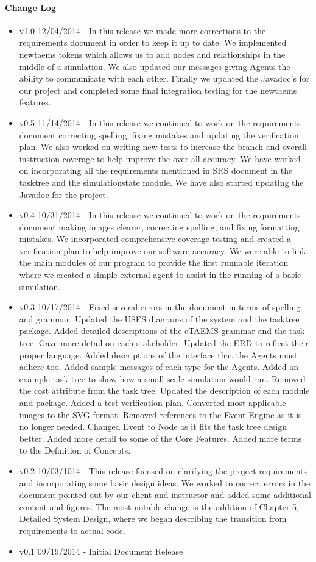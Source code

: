 \paragraph{Change Log}
\begin{itemize}
\item v1.0 12/04/2014 - In this release we made more corrections to the requirements document in order to keep it up to date. We implemented newtaems tokens which allows us to add nodes and relationships in the middle of a simulation. We also updated our messages giving Agents the ability to communicate with each other. Finally we updated the Javadoc's for our project and completed some final integration testing for the newtaems features.
\item v0.5 11/14/2014 - In this release we continued to work on the requirements document correcting spelling, fixing mistakes and updating the verification plan. We also worked on writing new tests to increase the branch and overall instruction coverage to help improve the over all accuracy. We have worked on incorporating all the requirements mentioned in SRS document in the tasktree and the simulationstate module. We have also started updating the Javadoc for the project.
\item v0.4 10/31/2014 - In this release we continued to work on the requirements
document making images clearer, correcting spelling, and fixing formatting mistakes. We incorporated comprehensive coverage testing and created a verification plan to help improve our software accuracy. We were able to link the main modules of our program to provide the first runnable iteration where we created a simple external agent to assist in the running of a basic simulation. 
\item v0.3 10/17/2014 - Fixed several errors in the document in terms
of spelling and grammar. Updated the USES diagrams of the system and the tasktree package. Added detailed descriptions of the cTAEMS grammar and the task tree. Gave more detail on each stakeholder. Updated the ERD to reflect their proper language. Added descriptions of the interface that the Agents must adhere too. Added sample messages of each type for the Agents. Added an example task tree to show how a small scale simulation would run. Removed the cost attribute from the task tree. Updated the description of each module and package. Added a test verification plan. Converted most applicable images to the SVG format. Removed references to the Event Engine as it is no longer needed. Changed Event to Node as it fits the task tree design better. Added more detail to some of the Core Features. Added more terms to the Definition of Concepts.
\item v0.2 10/03/1014 - This release focused on clarifying the project
requirements and incorporating some basic design ideas. We worked to correct errors in the document pointed out by our client and instructor and added some additional content and figures. The most notable change is the addition of Chapter 5, Detailed System Design, where we began describing the transition from requirements to actual code.
\item v0.1 09/19/2014 - Initial Document Release
\end{itemize}


